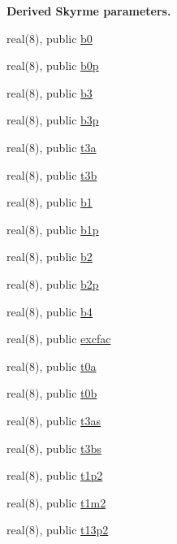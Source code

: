\begin{Indent}{\bf Derived Skyrme parameters.}\par
\begin{DoxyCompactItemize}
\item 
real(8), public \hyperlink{namespacedynpar_a53ab5951e0b2309de0b70a1c4ed03b07}{b0}
\item 
real(8), public \hyperlink{namespacedynpar_a379a8175aa37f44759f2b62bd27a76e0}{b0p}
\item 
real(8), public \hyperlink{namespacedynpar_a811a42f35301cbdb8ee37c6fdf56558c}{b3}
\item 
real(8), public \hyperlink{namespacedynpar_af78f594b9c951af8dc91b124d192df5c}{b3p}
\item 
real(8), public \hyperlink{namespacedynpar_ae4ae725b9d947daf64381a8f6e548950}{t3a}
\item 
real(8), public \hyperlink{namespacedynpar_af38239c24afd2676313e0c0a8c870081}{t3b}
\item 
real(8), public \hyperlink{namespacedynpar_aa95922396181850004ed652d9f5e3259}{b1}
\item 
real(8), public \hyperlink{namespacedynpar_a347f996a3226e7599806a449764a02aa}{b1p}
\item 
real(8), public \hyperlink{namespacedynpar_a6d8257ffb2114f236aac765b449e88d1}{b2}
\item 
real(8), public \hyperlink{namespacedynpar_a40942636c4d9f3131cc03ba0689344b3}{b2p}
\item 
real(8), public \hyperlink{namespacedynpar_a8f23cf4ba8078bb7640333e262d54d50}{b4}
\item 
real(8), public \hyperlink{namespacedynpar_a103907f87cc49eb26fa37bbe3b7bc949}{excfac}
\item 
real(8), public \hyperlink{namespacedynpar_a681cb5c9252ca4a841129d53e48dd8fc}{t0a}
\item 
real(8), public \hyperlink{namespacedynpar_a91a3c596507a193726e3767b0b42e939}{t0b}
\item 
real(8), public \hyperlink{namespacedynpar_afd89ca189016c6d6a5ae17df11a807a6}{t3as}
\item 
real(8), public \hyperlink{namespacedynpar_a11da6c261b7534cd869677b64ee925bc}{t3bs}
\item 
real(8), public \hyperlink{namespacedynpar_a7e24ee9b9f9dbbeb5f12c85c35eb606f}{t1p2}
\item 
real(8), public \hyperlink{namespacedynpar_a0b2a09851ee2793eb627728a2559c098}{t1m2}
\item 
real(8), public \hyperlink{namespacedynpar_aa24c90fcf265f58d86dda06a8e3b4114}{t13p2}

\end{DoxyCompactItemize}
\end{Indent}
